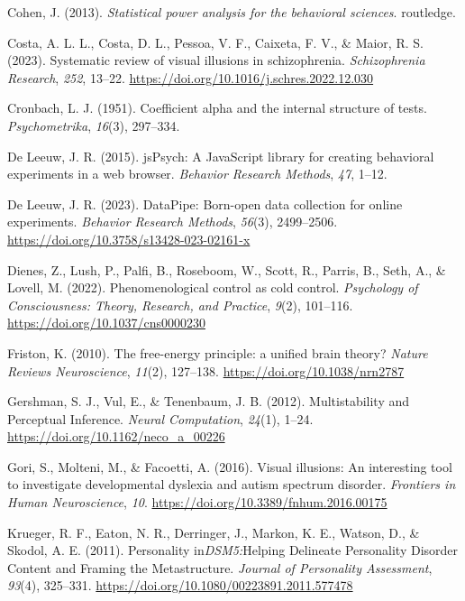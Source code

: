 \documentclass[
  man,
  floatsintext,
  longtable,
  nolmodern,
  notxfonts,
  notimes,
  colorlinks=true,linkcolor=blue,citecolor=blue,urlcolor=blue]{apa7}
\newlength{\cslhangindent}
\newenvironment{CSLReferences}[2] %
 {\begin{list}{}{%
  \setlength{\itemindent}{0pt}
  \setlength{\leftmargin}{0pt}
  \setlength{\parsep}{0pt}
  \ifodd #1
   \setlength{\leftmargin}{\cslhangindent}
   \setlength{\itemindent}{-1\cslhangindent}
  \fi
  \setlength{\itemsep}{#2\baselineskip}}}
 {\end{list}}
\begin{document}
\begin{CSLReferences}{1}{0}
Cohen, J. (2013). \emph{Statistical power analysis for the behavioral
sciences}. routledge.

Costa, A. L. L., Costa, D. L., Pessoa, V. F., Caixeta, F. V., \& Maior,
R. S. (2023). Systematic review of visual illusions in schizophrenia.
\emph{Schizophrenia Research}, \emph{252}, 13--22.
\url{https://doi.org/10.1016/j.schres.2022.12.030}

Cronbach, L. J. (1951). Coefficient alpha and the internal structure of
tests. \emph{Psychometrika}, \emph{16}(3), 297--334.

De Leeuw, J. R. (2015). jsPsych: A JavaScript library for creating
behavioral experiments in a web browser. \emph{Behavior Research
Methods}, \emph{47}, 1--12.

De Leeuw, J. R. (2023). DataPipe: Born-open data collection for online
experiments. \emph{Behavior Research Methods}, \emph{56}(3), 2499--2506.
\url{https://doi.org/10.3758/s13428-023-02161-x}

Dienes, Z., Lush, P., Palfi, B., Roseboom, W., Scott, R., Parris, B.,
Seth, A., \& Lovell, M. (2022). Phenomenological control as cold
control. \emph{Psychology of Consciousness: Theory, Research, and
Practice}, \emph{9}(2), 101--116.
\url{https://doi.org/10.1037/cns0000230}

Friston, K. (2010). The free-energy principle: a unified brain theory?
\emph{Nature Reviews Neuroscience}, \emph{11}(2), 127--138.
\url{https://doi.org/10.1038/nrn2787}

Gershman, S. J., Vul, E., \& Tenenbaum, J. B. (2012). Multistability and
Perceptual Inference. \emph{Neural Computation}, \emph{24}(1), 1--24.
\url{https://doi.org/10.1162/neco_a_00226}

Gori, S., Molteni, M., \& Facoetti, A. (2016). Visual illusions: An
interesting tool to investigate developmental dyslexia and autism
spectrum disorder. \emph{Frontiers in Human Neuroscience}, \emph{10}.
\url{https://doi.org/10.3389/fnhum.2016.00175}

Krueger, R. F., Eaton, N. R., Derringer, J., Markon, K. E., Watson, D.,
\& Skodol, A. E. (2011). Personality
in{\emph{DSM{\textendash}5:}}Helping Delineate Personality Disorder
Content and Framing the Metastructure. \emph{Journal of Personality
Assessment}, \emph{93}(4), 325--331.
\url{https://doi.org/10.1080/00223891.2011.577478}


\end{CSLReferences}
\end{document}
